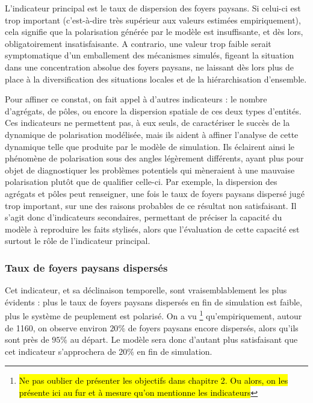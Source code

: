 L'indicateur principal est le taux de dispersion des foyers paysans.
Si celui-ci est trop important (c'est-à-dire très supérieur aux valeurs estimées empiriquement), cela signifie que la polarisation générée par le modèle est insuffisante, et dès lors, obligatoirement insatisfaisante.
A contrario, une valeur trop faible serait symptomatique d'un emballement des mécanismes simulés, figeant la situation dans une concentration absolue des foyers paysans, ne laissant dès lors plus de place à la diversification des situations locales et de la hiérarchisation d'ensemble.

Pour affiner ce constat, on fait appel à d'autres indicateurs :
le nombre d'agrégats, de pôles, ou encore la dispersion spatiale de ces deux types d'entités.
Ces indicateurs ne permettent pas, à eux seuls, de caractériser le succès de la dynamique de polarisation modélisée, mais ils aident à affiner l'analyse de cette dynamique telle que produite par le modèle de simulation.
Ils éclairent ainsi le phénomène de polarisation sous des angles légèrement différents, ayant plus pour objet de diagnostiquer les problèmes potentiels qui mèneraient à une mauvaise polarisation plutôt que de qualifier celle-ci.
Par exemple, la dispersion des agrégats et pôles peut renseigner, une fois le taux de foyers paysans dispersé jugé trop important, sur une des raisons probables de ce résultat non satisfaisant.
Il s'agit donc d'indicateurs secondaires, permettant de préciser la capacité du modèle à reproduire les faits stylisés, alors que l'évaluation de cette capacité est surtout le rôle de l'indicateur principal.


\subsubsection{Taux de foyers paysans dispersés}

Cet indicateur, et sa déclinaison temporelle, sont vraisemblablement les plus évidents :
plus le taux de foyers paysans dispersés en fin de simulation est faible, plus le système de peuplement est polarisé.
On a vu \footnote{\hl{Ne pas oublier de présenter les objectifs dans chapitre 2. Ou alors, on les présente ici au fur et à mesure qu'on mentionne les indicateurs}} qu'empiriquement, autour de 1160, on observe environ $20\%$ de foyers paysans encore dispersés, alors qu'ils sont près de $95\%$ au départ.
Le modèle sera donc d'autant plus satisfaisant que cet indicateur s'approchera de $20\%$ en fin de simulation.

